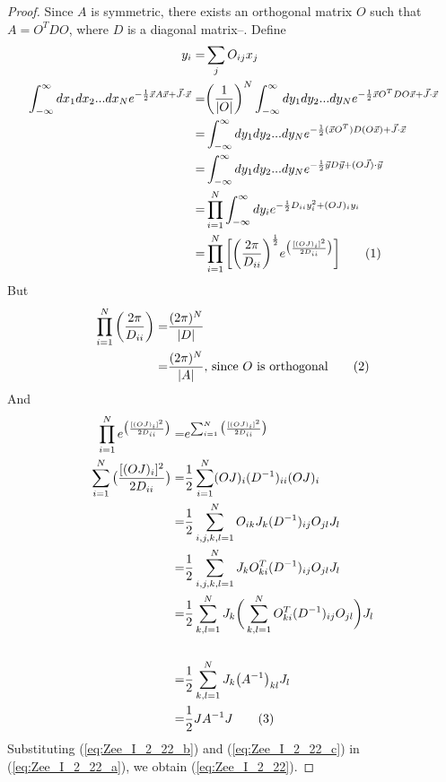 \documentclass[]{article}
\newcommand\numberthis{\addtocounter{equation}{1}\tag{\theequation}}
\begin{document}
\begin{proof}
	Since $A$ is symmetric, there exists an orthogonal matrix $O$ such that $A=O^T D O$, where $D$ is a diagonal matrix--\cite{bellman1970introduction}. Define
	\begin{align*}
		y_i =& \sum_j O_{ij}x_j\\
		\int_{-\infty}^{\infty}dx_1 dx_2...dx_N e^{-\frac{1}{2}\vec{x}A\vec{x} + \vec{J} \cdot \vec{x}}=&\bigg(\frac{1}{\vert O \vert}\bigg)^N \int_{-\infty}^{\infty}dy_1 dy_2...dy_Ne^{-\frac{1}{2}\vec{x}O^T D O\vec{x} + \vec{J} \cdot \vec{x}}\\
		=& \int_{-\infty}^{\infty}dy_1 dy_2...dy_N e^{-\frac{1}{2}(\vec{x}O^T) D (O\vec{x}) + \vec{J} \cdot \vec{x}}\\
		=& \int_{-\infty}^{\infty}dy_1 dy_2...dy_N e^{- \frac{1}{2} \vec{y}D \vec{y} + (O\vec{J})\cdot \vec{y}}\\
		=& \prod_{i=1}^N \int_{-\infty}^{\infty}dy_i e^{- \frac{1}{2} D_{ii}y_i^2 + (OJ)_i y_i}\\
		=& \prod_{i=1}^N \bigg[\bigg(\frac{2\pi}{D_{ii}}\bigg)^\frac{1}{2} e^{\big(\frac{[(OJ)_i]^2}{2D_{ii}}\big)}\bigg] \numberthis \label {eq:Zee_I_2_22_a}
	\end{align*}
	But
	\begin{align*}
		\prod_{i=1}^N \bigg(\frac{2\pi}{D_{ii}}\bigg) =& \frac{({2\pi})^N}{\vert D \vert}\\
		=& \frac{({2\pi})^N}{\vert A \vert} \text{, since $O$ is orthogonal} \numberthis \label {eq:Zee_I_2_22_b}
	\end{align*}
	And
	\begin{align*}
		\prod_{i=1}^N e^{\big(\frac{[(OJ)_i]^2}{2D_{ii}}\big)} =& e^{\sum_{i=1}^N {\big(\frac{[(OJ)_i]^2}{2D_{ii}}\big)}}\\
		\sum_{i=1}^N {\big(\frac{[(OJ)_i]^2}{2D_{ii}}\big)} =& \frac{1}{2} \sum_{i=1}^N (OJ)_i (D^{-1})_{ii} (OJ)_i\\
		 =& \frac{1}{2} \sum_{i,j,k,l=1}^N O_{ik} J_k (D^{-1})_{ij} O_{jl} J_l\\
		 =& \frac{1}{2} \sum_{i,j,k,l=1}^N J_k O^T_{ki}  (D^{-1})_{ij} O_{jl} J_l \\
		 =& \frac{1}{2} \sum_{k,l=1}^N J_k \bigg(\sum_{k,l=1}^N O^T_{ki}  (D^{-1})_{ij} O_{jl}\bigg) J_l\\
		  \\
		 =& \frac{1}{2} \sum_{k,l=1}^N J_k \big(A^{-1}\big)_{kl} J_l \\
		 =& \frac{1}{2} J A^{-1} J \numberthis \label {eq:Zee_I_2_22_c}
	\end{align*}
	Substituting (\ref{eq:Zee_I_2_22_b}) and (\ref{eq:Zee_I_2_22_c}) in (\ref{eq:Zee_I_2_22_a}), we obtain (\ref{eq:Zee_I_2_22}).
\end{proof}
\end{document}
